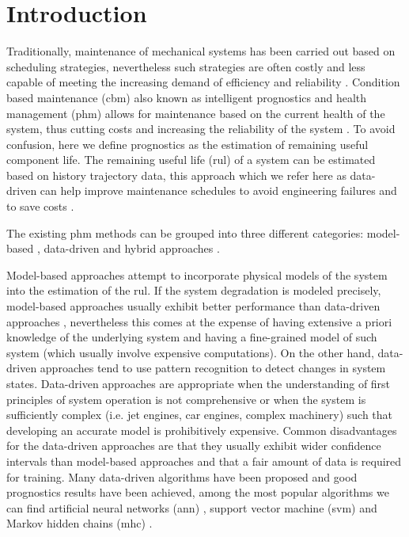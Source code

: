 \section{Introduction}
\label{sec:rul_intro}

Traditionally, maintenance of mechanical systems has been carried out based on scheduling strategies, nevertheless such strategies are often costly and less capable of meeting the increasing demand of efficiency and reliability \citep{Gebraeel2005, Zaidan2013}. Condition based maintenance (\gls{cbm}) also known as intelligent prognostics and health management (\gls{phm}) allows for maintenance based on the current health of the system, thus cutting costs and increasing the reliability of the system \citep{Zhao2017}. To avoid confusion, here we define prognostics as the estimation of remaining useful component life. The remaining useful life (\gls{rul}) of a system can be estimated based on history trajectory data, this approach which we refer here as data-driven can help improve maintenance schedules to avoid engineering failures and to save costs \citep{Lee2014}.

The existing \gls{phm} methods can be grouped into three different categories: model-based \citep{Yu2001} , data-driven \citep{Liu2009, Mosallam2013} and hybrid approaches \citep{Pecht2010, Liu2012}.

Model-based approaches attempt to incorporate physical models of the system into the estimation of the \gls{rul}. If the system degradation is modeled  precisely, model-based approaches usually exhibit better performance than data-driven approaches \citep{Qian2017}, nevertheless this comes at the expense of having extensive a priori knowledge of the underlying system and having a fine-grained model of such system (which usually involve expensive computations). On the other hand, data-driven approaches tend to use pattern recognition to detect changes in system states. Data-driven approaches are appropriate when the understanding of first principles of system operation is not comprehensive or when the system is sufficiently complex (i.e. jet engines, car engines, complex machinery) such that developing an accurate model is prohibitively expensive. Common disadvantages for the data-driven approaches are that they usually exhibit wider confidence intervals than model-based approaches and that a fair amount of data is required for training. Many data-driven algorithms have been proposed and good prognostics results have been achieved, among the most popular algorithms we can find artificial neural networks (\gls{ann}) \citep{Gebraeel2004}, support vector machine (\gls{svm}) \citep{Benkedjouh2013} and Markov hidden chains (\gls{mhc}) \citep{Dong2007}.

